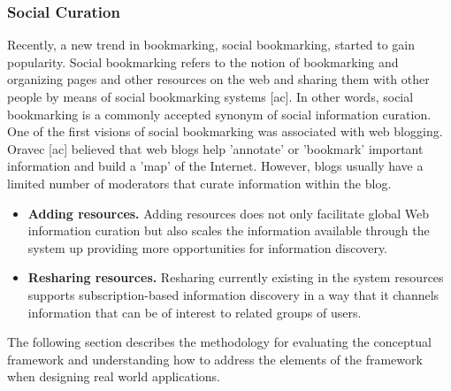 \documentclass{casconpaper}
\begin{document}
{\subsubsection{Social Curation}
Recently, a new trend in bookmarking, social bookmarking, started to gain popularity. Social bookmarking refers to the notion of bookmarking and organizing pages and other resources on the web and sharing them with other people by means of social bookmarking systems [ac]. In other words, social bookmarking is a commonly accepted synonym of social information curation. One of the first visions of social bookmarking was associated with web blogging. Oravec [ac] believed that web blogs help 'annotate' or 'bookmark' important information and build a 'map' of the Internet. However, blogs usually have a limited number of moderators that curate information within the blog. 
\begin{itemize}
  \item \textbf{Adding resources.} Adding resources does not only facilitate global Web information curation but also scales the information available through the system up providing more opportunities for information discovery.
  \item \textbf{Resharing resources.} Resharing currently existing in the system resources supports subscription-based information discovery in a way that it channels information that can be of interest to related groups of users. 
 
\end{itemize}
} %

The following section describes the methodology for evaluating the conceptual framework and understanding how to address the elements of the framework when designing real world applications.
\end{document}
